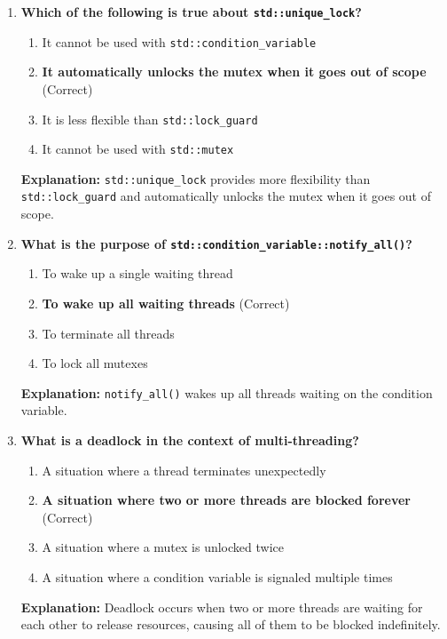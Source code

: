 \documentclass[12pt]{article}
\begin{document}
\begin{enumerate}
    \item \textbf{Which of the following is true about \texttt{std::unique\_lock}?}
    \begin{enumerate}[label=(\alph*)]
        \item It cannot be used with \texttt{std::condition\_variable}
        \item \textbf{It automatically unlocks the mutex when it goes out of scope} (Correct)
        \item It is less flexible than \texttt{std::lock\_guard}
        \item It cannot be used with \texttt{std::mutex}
    \end{enumerate}
    \textbf{Explanation:} \texttt{std::unique\_lock} provides more flexibility than \texttt{std::lock\_guard} and automatically unlocks the mutex when it goes out of scope.

    \item \textbf{What is the purpose of \texttt{std::condition\_variable::notify\_all()}?}
    \begin{enumerate}[label=(\alph*)]
        \item To wake up a single waiting thread
        \item \textbf{To wake up all waiting threads} (Correct)
        \item To terminate all threads
        \item To lock all mutexes
    \end{enumerate}
    \textbf{Explanation:} \texttt{notify\_all()} wakes up all threads waiting on the condition variable.

    \item \textbf{What is a deadlock in the context of multi-threading?}
    \begin{enumerate}[label=(\alph*)]
        \item A situation where a thread terminates unexpectedly
        \item \textbf{A situation where two or more threads are blocked forever} (Correct)
        \item A situation where a mutex is unlocked twice
        \item A situation where a condition variable is signaled multiple times
    \end{enumerate}
    \textbf{Explanation:} Deadlock occurs when two or more threads are waiting for each other to release resources, causing all of them to be blocked indefinitely.
\end{enumerate}
\end{document}
